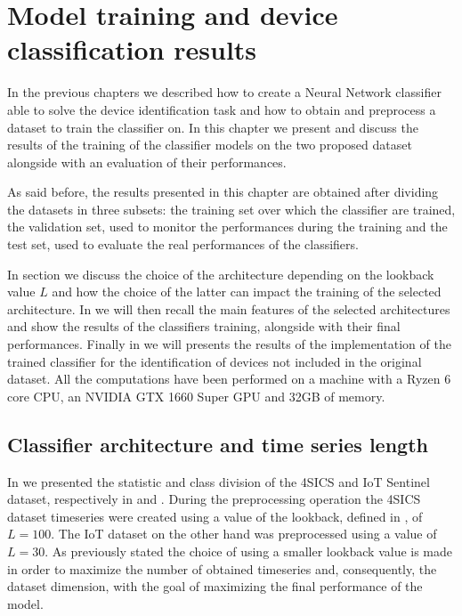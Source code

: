 \chapter{Model training and device classification results} \label{chap6}

In the previous chapters we described how to create a Neural Network classifier able to solve the device identification task and how to obtain and preprocess a dataset to train the classifier on. In this chapter we present and discuss the results of the training of the classifier models on the two proposed dataset alongside with an evaluation of their performances.

As said before, the results presented in this chapter are obtained after dividing the datasets in three subsets: the training set over which the classifier are trained, the validation set, used to monitor the performances during the training and the test set, used to evaluate the real performances of the classifiers.

In section  we discuss the choice of the architecture depending on the lookback value $L$ and how the choice of the latter can impact the training of the selected architecture. In  we will then recall the main features of the selected architectures and show the results of the classifiers training, alongside with their final performances. Finally in  we will presents the results of the implementation of the trained classifier for the identification of devices not included in the original dataset. All the computations have been performed on a machine with a Ryzen 6 core CPU, an NVIDIA GTX 1660 Super GPU and 32GB of memory.


\section{Classifier architecture and time series length}\label{res_lb}

In  we presented the statistic and class division of the 4SICS and IoT Sentinel dataset, respectively in  and . During the preprocessing operation the 4SICS dataset timeseries were created using a value of the lookback, defined in , of $L=100$. The IoT dataset on the other hand was preprocessed using a value of $L=30$. As previously stated the choice of using a smaller lookback value is made in order to maximize the number of obtained timeseries and, consequently, the dataset dimension, with the goal of maximizing the final performance of the model. 

